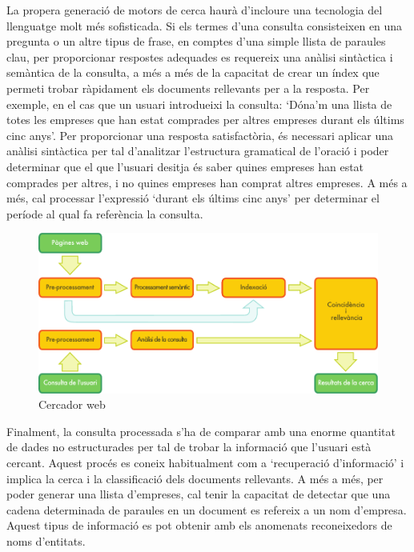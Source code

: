 \begin{multicols}{2}
La propera generació de motors de cerca haurà d’incloure una tecnologia del llenguatge molt més sofisticada. Si els termes d’una consulta consisteixen en una pregunta o un altre tipus de frase, en comptes d’una simple llista de paraules clau, per proporcionar respostes adequades es requereix una anàlisi sintàctica i semàntica de la consulta, a més  a més de la capacitat de crear un índex que permeti trobar ràpidament els documents rellevants per a la resposta. Per exemple, en el cas que un usuari introdueixi la consulta: ‘Dóna’m una llista de totes les empreses que han estat comprades per altres empreses durant els últims cinc anys’. Per proporcionar una resposta satisfactòria, és necessari aplicar una anàlisi sintàctica per tal d’analitzar l’estructura gramatical de l’oració i poder determinar que el que l’usuari desitja és saber quines empreses han estat comprades per altres, i no quines empreses han comprat altres empreses. A més a més, cal processar  l’expressió ‘durant els últims cinc anys’ per determinar el període al qual fa referència la consulta. 

\begin{figure}[htb]
  \center
  \includegraphics[width=\textwidth]{../_media/catalan/web_search_architecture}
  \vspace{-5mm}
  \caption{Cercador web}
  \label{fig:websearcharch_ca}
\end{figure}

Finalment, la consulta processada s’ha de comparar amb una enorme quantitat de dades no estructurades per tal de trobar la informació que l'usuari està cercant. Aquest procés es coneix habitualment com a ‘recuperació d'informació’ i implica la cerca i la classificació dels documents rellevants. A més a més, per poder generar una llista d’empreses, cal tenir la capacitat de detectar que una cadena determinada de paraules en un document es refereix a un nom d'empresa. Aquest tipus de informació es pot obtenir amb els anomenats reconeixedors de noms d’entitats.


\end{multicols}
